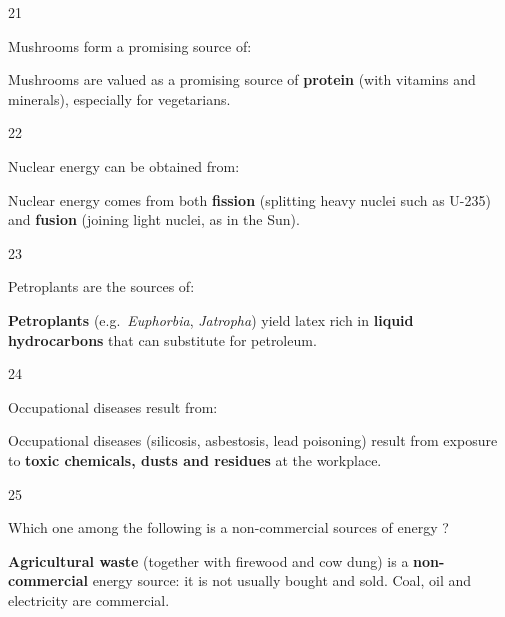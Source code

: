 \begin{question}{21}
{Mushrooms form a promising source of:\par}
\begin{explain}
Mushrooms are valued as a promising source of \textbf{protein} (with vitamins and minerals), especially for vegetarians.
\end{explain}
\end{question}

\begin{question}{22}
{Nuclear energy can be obtained from:\par}
\begin{explain}
Nuclear energy comes from both \textbf{fission} (splitting heavy nuclei such as U-235) and \textbf{fusion} (joining light nuclei, as in the Sun).
\end{explain}
\end{question}

\begin{question}{23}
{Petroplants are the sources of:\par}
\begin{explain}
\textbf{Petroplants} (e.g.\ \emph{Euphorbia}, \emph{Jatropha}) yield latex rich in \textbf{liquid hydrocarbons} that can substitute for petroleum.
\end{explain}
\end{question}

\begin{question}{24}
{Occupational diseases result from:\par}
\begin{explain}
Occupational diseases (silicosis, asbestosis, lead poisoning) result from exposure to \textbf{toxic chemicals, dusts and residues} at the workplace.
\end{explain}
\end{question}

\begin{question}{25}
{Which one among the following is a non-commercial sources of energy ?\par}
\begin{explain}
\textbf{Agricultural waste} (together with firewood and cow dung) is a \textbf{non-commercial} energy source: it is not usually bought and sold. Coal, oil and electricity are commercial.
\end{explain}
\end{question}

